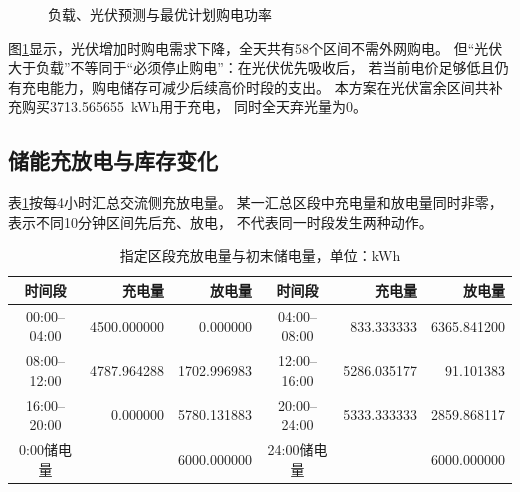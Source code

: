 \documentclass[UTF8,a4paper,12pt,fontset=fandol]{ctexart}
\newcommand{\PVGridTopup}{3713.565655}
\begin{document}
\begin{figure}[htbp]
  \centering
  \caption{负载、光伏预测与最优计划购电功率}\label{fig:power}
\end{figure}

图\ref{fig:power}显示，光伏增加时购电需求下降，全天共有58个区间不需外网购电。
但“光伏大于负载”不等同于“必须停止购电”：在光伏优先吸收后，
若当前电价足够低且仍有充电能力，购电储存可减少后续高价时段的支出。
本方案在光伏富余区间共补充购买\PVGridTopup\ kWh用于充电，
同时全天弃光量为0。

\subsection{储能充放电与库存变化}
表\ref{tab:storage}按每4小时汇总交流侧充放电量。
某一汇总区段中充电量和放电量同时非零，表示不同10分钟区间先后充、放电，
不代表同一时段发生两种动作。

\begin{table}[htbp]
  \centering\small
  \setlength{\tabcolsep}{4.5pt}
  \caption{指定区段充放电量与初末储电量，单位：kWh}\label{tab:storage}
  \begin{tabular}{crrcrr}
    \toprule
    时间段 & 充电量 & 放电量 & 时间段 & 充电量 & 放电量\\
    \midrule
    00:00--04:00 & 4500.000000 & 0.000000 & 04:00--08:00 & 833.333333 & 6365.841200\\
    08:00--12:00 & 4787.964288 & 1702.996983 & 12:00--16:00 & 5286.035177 & 91.101383\\
    16:00--20:00 & 0.000000 & 5780.131883 & 20:00--24:00 & 5333.333333 & 2859.868117\\
    \midrule
    0:00储电量 & \multicolumn{2}{r}{6000.000000}
    & 24:00储电量 & \multicolumn{2}{r}{6000.000000}\\
    \bottomrule
  \end{tabular}
\end{table}
\end{document}
